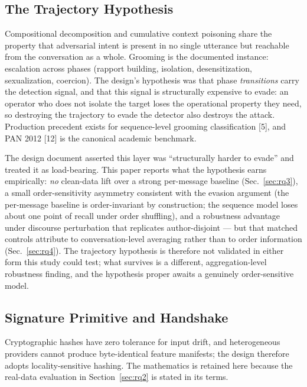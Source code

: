 \documentclass[11pt]{article}
\begin{document}
\subsection{The Trajectory Hypothesis}
\label{sec:trajectory}

Compositional decomposition and cumulative context poisoning share the property that adversarial intent is present in no single utterance but reachable from the conversation as a whole. Grooming is the documented instance: escalation across phases (rapport building, isolation, desensitization, sexualization, coercion). The design's hypothesis was that phase \emph{transitions} carry the detection signal, and that this signal is structurally expensive to evade: an operator who does not isolate the target loses the operational property they need, so destroying the trajectory to evade the detector also destroys the attack. Production precedent exists for sequence-level grooming classification [5], and PAN 2012 [12] is the canonical academic benchmark.

The design document asserted this layer was ``structurally harder to evade'' and treated it as load-bearing. This paper reports what the hypothesis earns empirically: \emph{no} clean-data lift over a strong per-message baseline (Sec.~\ref{sec:rq3}), a small order-sensitivity asymmetry consistent with the evasion argument (the per-message baseline is order-invariant by construction; the sequence model loses about one point of recall under order shuffling), and a robustness advantage under discourse perturbation that replicates author-disjoint --- but that matched controls attribute to conversation-level averaging rather than to order information (Sec.~\ref{sec:rq4}). The trajectory hypothesis is therefore not validated in either form this study could test; what survives is a different, aggregation-level robustness finding, and the hypothesis proper awaits a genuinely order-sensitive model.

\subsection{Signature Primitive and Handshake}
\label{sec:primitives}

Cryptographic hashes have zero tolerance for input drift, and heterogeneous providers cannot produce byte-identical feature manifests; the design therefore adopts locality-sensitive hashing. The mathematics is retained here because the real-data evaluation in Section~\ref{sec:rq2} is stated in its terms.
\end{document}

